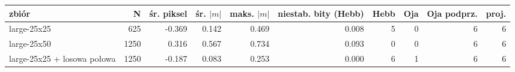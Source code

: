 \begin{tabular}{lrrrrrrrrr}

\toprule

zbiór & N & śr. piksel & śr. $|m|$ & maks. $|m|$ & niestab. bity (Hebb) & Hebb & Oja & Oja podprz. & proj. \\

\midrule

large-25x25 & 625 & -0.369 & 0.142 & 0.469 & 0.008 & 5 & 0 & 6 & 6 \\

large-25x50 & 1250 & 0.316 & 0.567 & 0.734 & 0.093 & 0 & 0 & 6 & 6 \\

large-25x25 + losowa połowa & 1250 & -0.187 & 0.083 & 0.253 & 0.000 & 6 & 1 & 6 & 6 \\

\bottomrule

\end{tabular}

